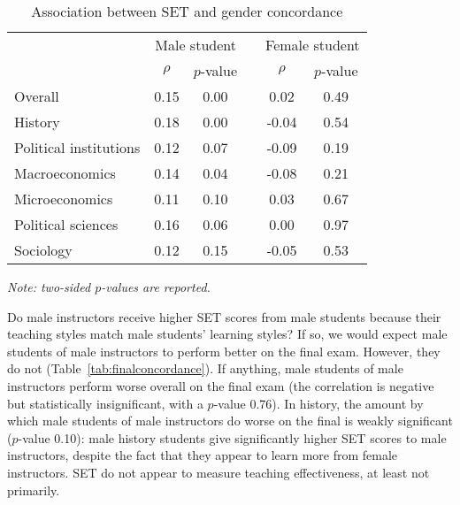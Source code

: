 \documentclass[12pt]{article}
\begin{document}
\begin{table}[htbp]
  \centering
  \footnotesize 
  \caption{Association between SET and gender concordance}
    \begin{tabular}{lccccc}
    \toprule 
          & \multicolumn{2}{c}{Male student}  &  & \multicolumn{2}{c}{Female student} \\
      & $\rho$  &  $p$-value &  & $\rho$  &  $p$-value    \\
   \midrule
      \quad  Overall &                 0.15       & 0.00 & &  0.02       & 0.49      \\
      \quad  History &                 0.18       & 0.00 & & -0.04       & 0.54      \\
      \quad  Political institutions &  0.12       & 0.07 & & -0.09       & 0.19       \\
      \quad  Macroeconomics &          0.14       & 0.04 & & -0.08       & 0.21     \\
      \quad  Microeconomics &          0.11       & 0.10 & &  0.03       & 0.67       \\
      \quad  Political sciences &      0.16       & 0.06 & &  0.00       & 0.97      \\
      \quad  Sociology &               0.12       & 0.15 & & -0.05       & 0.53      \\
    \bottomrule
    \end{tabular}%
 \label{tab:genderconcordance}%
  
  \textit{Note: two-sided $p$-values are reported.}
\end{table}%
\normalsize


Do male instructors receive higher SET scores from male students because their teaching styles match male students' learning styles? 
If so, we would expect male students of male instructors to perform better on the final exam. 
However, they do not (Table~\ref{tab:finalconcordance}). 
If anything, male students of male instructors perform worse overall on the final exam (the correlation is negative but statistically insignificant, with a $p$-value 0.76). 
In history, the amount by which male students of male instructors do worse on the final
is weakly significant ($p$-value 0.10):
male history students give significantly higher SET scores to male instructors, despite the fact that 
they appear to learn more from female instructors. 
SET do not appear to measure teaching effectiveness, at least not primarily.
\end{document}
